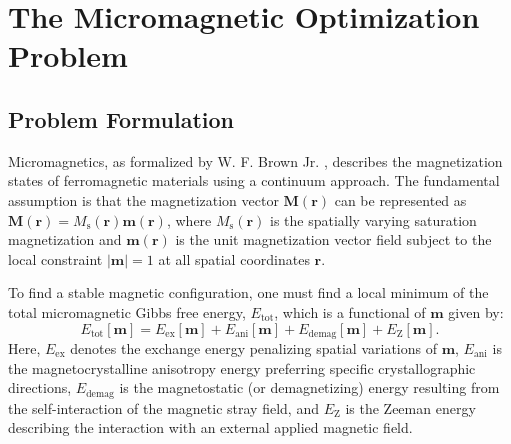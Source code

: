\documentclass[10pt, a4paper, twocolumn]{article}
\begin{document}
\section{The Micromagnetic Optimization Problem}

\subsection{Problem Formulation}
Micromagnetics, as formalized by W. F. Brown Jr. \cite{Brown1963}, describes the magnetization states of ferromagnetic materials using a continuum approach. The fundamental assumption is that the magnetization vector $\mathbf{M}(\mathbf{r})$ can be represented as $\mathbf{M}(\mathbf{r}) = M_\mathrm{s}(\mathbf{r}) \mathbf{m}(\mathbf{r})$, where $M_\mathrm{s}(\mathbf{r})$ is the spatially varying saturation magnetization and $\mathbf{m}(\mathbf{r})$ is the unit magnetization vector field subject to the local constraint $|\mathbf{m}| = 1$ at all spatial coordinates $\mathbf{r}$.

To find a stable magnetic configuration, one must find a local minimum of the total micromagnetic Gibbs free energy, $E_{\mathrm{tot}}$, which is a functional of $\mathbf{m}$ given by:
\begin{equation}
    E_{\mathrm{tot}}[\mathbf{m}] = E_{\mathrm{ex}}[\mathbf{m}] + E_{\mathrm{ani}}[\mathbf{m}] + E_{\mathrm{demag}}[\mathbf{m}] + E_{\mathrm{Z}}[\mathbf{m}].
\end{equation}
Here, $E_{\mathrm{ex}}$ denotes the exchange energy penalizing spatial variations of $\mathbf{m}$, $E_{\mathrm{ani}}$ is the magnetocrystalline anisotropy energy preferring specific crystallographic directions, $E_{\mathrm{demag}}$ is the magnetostatic (or demagnetizing) energy resulting from the self-interaction of the magnetic stray field, and $E_{\mathrm{Z}}$ is the Zeeman energy describing the interaction with an external applied magnetic field.
\end{document}
